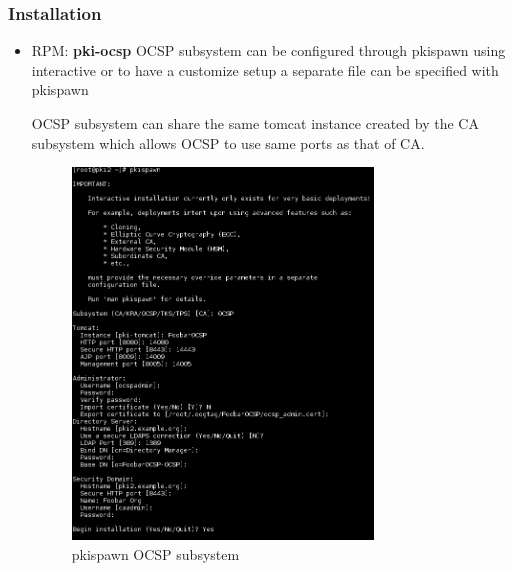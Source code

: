 \documentclass[12pt]{report}
\begin{document}
\subsubsection{Installation}
    \begin{itemize}
        \item RPM: \textbf{pki-ocsp}
            OCSP subsystem can be configured through pkispawn using interactive or to have a customize
            setup a separate file can be specified with pkispawn

            OCSP subsystem can share the same tomcat instance created by the CA subsystem which allows
            OCSP to use same ports as that of CA.
            \begin{figure}[H]
                \centering
                \includegraphics[width=80mm]{Images/pkispawn-ocsp.png}
                \caption{pkispawn OCSP subsystem}
            \end{figure}
    \end{itemize}
\end{document}
